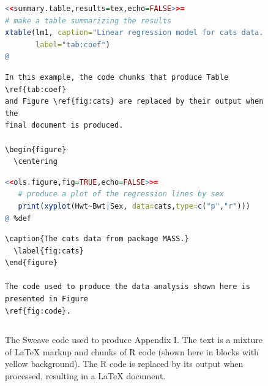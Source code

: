 \documentclass[11pt,article,oneside]{memoir}
\begin{document}
\begin{figure}
\begin{lstlisting}[language=R,numbers=none,style=sweave-r] 
<<summary.table,results=tex,echo=FALSE>>=
# make a table summarizing the results
xtable(lm1, caption="Linear regression model for cats data.", 
       label="tab:coef")
@ 
\end{lstlisting}
\begin{lstlisting}[language={[latex]tex},numbers=none,style=sweave-tex] 
In this example, the code chunks that produce Table \ref{tab:coef} 
and Figure \ref{fig:cats} are replaced by their output when the 
final document is produced. 

\begin{figure}
  \centering
\end{lstlisting}
\begin{lstlisting}[language=R,numbers=none,style=sweave-r] 
<<ols.figure,fig=TRUE,echo=FALSE>>=
   # produce a plot of the regression lines by sex
   print(xyplot(Hwt~Bwt|Sex, data=cats,type=c("p","r")))
@ %def 
\end{lstlisting}
\begin{lstlisting}[language={[latex]tex},numbers=none,style=sweave-tex] 
  \caption{The cats data from package MASS.}
  \label{fig:cats}
\end{figure}
 
The code used to produce the data analysis shown here is presented in Figure 
\ref{fig:code}.
\end{lstlisting}
\begin{lstlisting}[style=sweave-bottom]

\end{lstlisting}
  \caption{The Sweave code used to produce Appendix I. The text is a mixture of
    LaTeX markup and chunks of R code (shown here in blocks with yellow
    background). The R code is replaced by its output when processed, resulting
    in a LaTeX document.}
\label{fig:code}
\end{figure}
 


\end{document}
